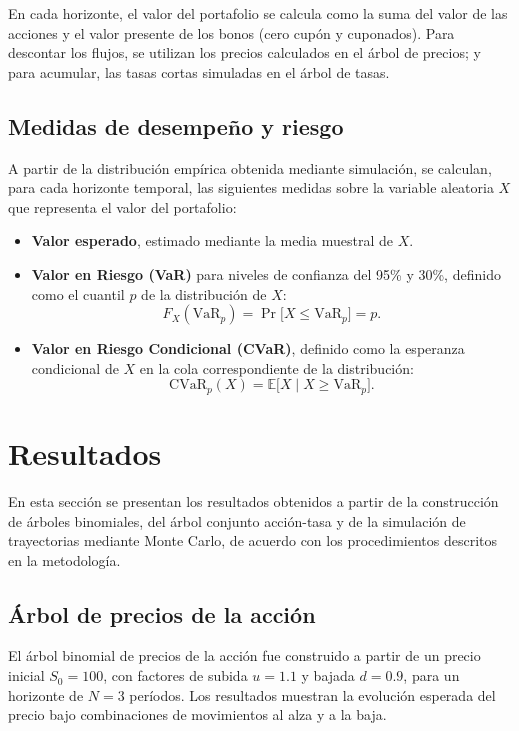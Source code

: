 \documentclass[12pt, a4paper]{article}
\begin{document}
En cada horizonte, el valor del portafolio se calcula como la suma del valor de las acciones y el valor presente de los bonos (cero cupón y cuponados). Para descontar los flujos, se utilizan los precios calculados en el árbol de precios; y para acumular, las tasas cortas simuladas en el árbol de tasas.

\subsection{Medidas de desempeño y riesgo}

A partir de la distribución empírica obtenida mediante simulación, se calculan, para cada horizonte temporal, las siguientes medidas sobre la variable aleatoria $X$ que representa el valor del portafolio:

\begin{itemize}
  \item \textbf{Valor esperado}, estimado mediante la media muestral de $X$.

  \item \textbf{Valor en Riesgo (VaR)} para niveles de confianza del 95\% y 30\%, definido como el cuantil $p$ de la distribución de $X$:
  $$
    F_X(\mathrm{VaR}_p)
    = \Pr\bigl[X \le \mathrm{VaR}_p\bigr]
    = p.
  $$

  \item \textbf{Valor en Riesgo Condicional (CVaR)}, definido como la esperanza condicional de $X$ en la cola correspondiente de la distribución:
  $$
    \mathrm{CVaR}_p(X)
    = \mathbb{E}\bigl[X \mid X \ge \mathrm{VaR}_p\bigr].
  $$
\end{itemize}


\section{Resultados}

En esta sección se presentan los resultados obtenidos a partir de la construcción de árboles binomiales, del árbol conjunto acción-tasa y de la simulación de trayectorias mediante Monte Carlo, de acuerdo con los procedimientos descritos en la metodología.

\subsection{Árbol de precios de la acción}

El árbol binomial de precios de la acción fue construido a partir de un precio inicial \(S_0 = 100\), con factores de subida \(u = 1.1\) y bajada \(d = 0.9\), para un horizonte de \(N = 3\) períodos. Los resultados muestran la evolución esperada del precio bajo combinaciones de movimientos al alza y a la baja.
\end{document}
